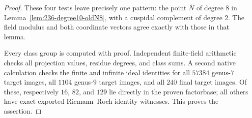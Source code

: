 \begin{proof}
These four tests leave precisely one pattern: the point
$\overline N$ of degree $8$ in
Lemma~\ref{lem:236-degree10-oldN8}, with a cuspidal complement
of degree $2$. The field modulus and both coordinate vectors
agree exactly with those in that lemma.

Every class group is computed with proof.
Independent finite-field arithmetic checks all projection values,
residue degrees, and class sums.
A second native calculation checks the finite and infinite ideal
identities for all $57384$ genus-$7$ target images,
all $1104$ genus-$9$ target images, and all $240$ final target
images. Of these, respectively $16$, $82$, and $129$ lie directly
in the proven factorbase; all others have exact exported
Riemann--Roch identity witnesses.
This proves the assertion.
\end{proof}





